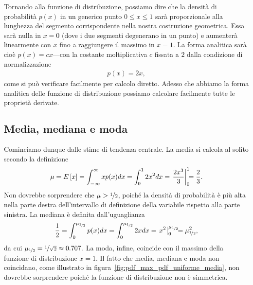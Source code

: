 
Tornando alla funzione di distribuzione, possiamo dire che la densità di
probabilità $p(x)$ in un generico punto $0 \leq x \leq 1$ sarà proporzionale
alla lunghezza del segmento corrispondente nella nostra costruzione
geometrica. Essa sarà nulla in $x = 0$ (dove i due segmenti degenerano in un
punto) e aumenterà linearmente con $x$ fino a raggiungere il massimo in
$x = 1$. La forma analitica sarà cioè $p(x) = cx$---con la
costante moltiplicativa $c$ fissata a $2$ dalla condizione di normalizzazione
\begin{align}\label{eq:pdf_triangolare_max}
  p(x) = 2x,
\end{align}
come si può verificare facilmente per calcolo diretto. Adesso che abbiamo
la forma analitica delle funzione di distribuzione possiamo calcolare
facilmente tutte le proprietà derivate.


\subsection{Media, mediana e moda}

Cominciamo dunque dalle stime di tendenza centrale. La media si calcola al
solito secondo la definizione
\begin{align*}
  \mu = \expect{x} = \int_{-\infty}^{\infty} xp(x)dx = \int_{0}^{1}2x^2dx =
  \eval{\frac{2x^3}{3}}{0}{1} = \frac{2}{3}.
\end{align*}
Non dovrebbe sorprendere che $\mu > \nicefrac{1}{2}$, poiché la densità di
probabilità è più alta nella parte destra dell'intervallo di definizione
della variabile rispetto alla parte sinistra. La mediana è definita
dall'uguaglianza
\begin{align*}
  \frac{1}{2} = \int_{0}^{\median}p(x)dx = \int_{0}^{\median}2xdx =
  \eval{x^2}{0}{\median} \;\;\;\; = \median^2,
\end{align*}
da cui $\mu_{\nicefrac{1}{2}} = \nicefrac{1}{\sqrt{2}} \approx 0.707$. La moda, infine,
coincide con il massimo della funzione di distribuzione $x = 1$. Il fatto che
media, mediana e moda non coincidano, come illustrato in
figura~\ref{fig:pdf_max_pdf_uniforme_media}, non dovrebbe sorprendere poiché
la funzione di distribuzione non è simmetrica.


